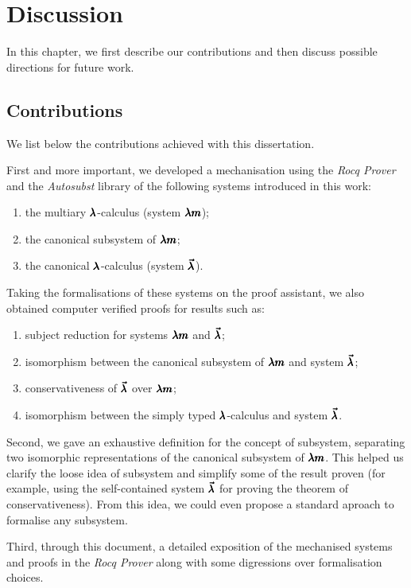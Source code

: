 \chapter{Discussion}
\label{c:discussion}

In this chapter, we first describe our contributions and then discuss possible directions for future work.

\section{Contributions}

We list below the contributions achieved with this dissertation.

First and more important, we developed a mechanisation using the \textit{Rocq Prover} and the \textit{Autosubst} library of the following systems introduced in this work:
\begin{enumerate}
\item the multiary $\pmb{\lambda}$-calculus (system $\pmb{\lambda m}$);
\item the canonical subsystem of $\pmb{\lambda m}$;
\item the canonical $\pmb{\lambda}$-calculus (system $\pmb{\vec \lambda}$).
\end{enumerate}
Taking the formalisations of these systems on the proof assistant, we also obtained computer verified proofs for results such as:
\begin{enumerate}
\item subject reduction for systems $\pmb{\lambda m}$ and $\pmb{\vec \lambda}$;
\item isomorphism between the canonical subsystem of $\pmb{\lambda m}$ and system $\pmb{\vec \lambda}$;
\item conservativeness of $\pmb{\vec \lambda}$ over $\pmb{\lambda m}$;
\item isomorphism between the simply typed $\pmb{\lambda}$-calculus and system $\pmb{\vec \lambda}$.
\end{enumerate}

Second, we gave an exhaustive definition for the concept of subsystem, separating two isomorphic representations of the canonical subsystem of $\pmb{\lambda m}$.
This helped us clarify the loose idea of subsystem and simplify some of the result proven (for example, using the self-contained system $\pmb{\vec \lambda}$ for proving the theorem of conservativeness).
From this idea, we could even propose a standard aproach to formalise any subsystem.

Third, through this document, a detailed exposition of the mechanised systems and proofs in the \textit{Rocq Prover} along with some digressions over formalisation choices.

